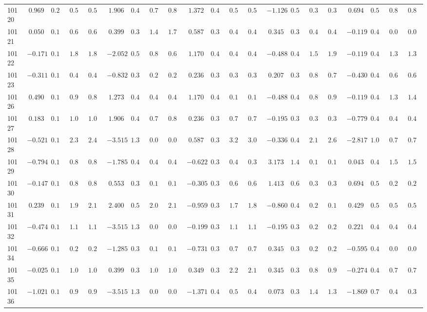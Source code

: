 \documentclass[6pt]{article}
\begin{document}
\begin{landscape}
{\begin{longtable}{lrrrrrrrrrrrrrrrrrrrr}
10120&$ 0.969$&$0.240$&$0.595$&$0.566$&$ 1.906$&$0.483$&$0.791$&$0.888$&$ 1.372$&$0.492$&$0.530$&$0.588$&$-1.126$&$0.578$&$0.398$&$0.306$&$ 0.694$&$0.577$&$0.864$&$0.879$\tabularnewline
10121&$ 0.050$&$0.161$&$0.661$&$0.694$&$ 0.399$&$0.382$&$1.481$&$1.713$&$ 0.587$&$0.361$&$0.402$&$0.425$&$ 0.345$&$0.396$&$0.487$&$0.452$&$-0.119$&$0.426$&$0.017$&$0.017$\tabularnewline
10122&$-0.171$&$0.155$&$1.833$&$1.867$&$-2.052$&$0.572$&$0.878$&$0.690$&$ 1.170$&$0.443$&$0.441$&$0.480$&$-0.488$&$0.420$&$1.565$&$1.940$&$-0.119$&$0.426$&$1.391$&$1.366$\tabularnewline
10123&$-0.311$&$0.154$&$0.497$&$0.495$&$-0.832$&$0.330$&$0.240$&$0.260$&$ 0.236$&$0.340$&$0.375$&$0.387$&$ 0.207$&$0.387$&$0.821$&$0.793$&$-0.430$&$0.428$&$0.672$&$0.685$\tabularnewline
10126&$ 0.490$&$0.188$&$0.917$&$0.803$&$ 1.273$&$0.443$&$0.452$&$0.457$&$ 1.170$&$0.443$&$0.156$&$0.122$&$-0.488$&$0.420$&$0.854$&$0.996$&$-0.119$&$0.426$&$1.376$&$1.400$\tabularnewline
10127&$ 0.183$&$0.167$&$1.085$&$1.042$&$ 1.906$&$0.483$&$0.740$&$0.808$&$ 0.236$&$0.340$&$0.780$&$0.781$&$-0.195$&$0.390$&$0.330$&$0.359$&$-0.779$&$0.473$&$0.434$&$0.443$\tabularnewline
10128&$-0.521$&$0.155$&$2.364$&$2.405$&$-3.515$&$1.347$&$0.087$&$0.096$&$ 0.587$&$0.361$&$3.270$&$3.014$&$-0.336$&$0.401$&$2.149$&$2.637$&$-2.817$&$1.034$&$0.766$&$0.763$\tabularnewline
10129&$-0.794$&$0.164$&$0.817$&$0.850$&$-1.785$&$0.486$&$0.427$&$0.471$&$-0.622$&$0.335$&$0.418$&$0.391$&$ 3.173$&$1.487$&$0.122$&$0.133$&$ 0.043$&$0.438$&$1.521$&$1.516$\tabularnewline
10130&$-0.147$&$0.155$&$0.870$&$0.817$&$ 0.553$&$0.395$&$0.119$&$0.119$&$-0.305$&$0.330$&$0.676$&$0.674$&$ 1.413$&$0.633$&$0.328$&$0.321$&$ 0.694$&$0.577$&$0.282$&$0.288$\tabularnewline
10131&$ 0.239$&$0.170$&$1.986$&$2.120$&$ 2.400$&$0.530$&$2.083$&$2.163$&$-0.959$&$0.358$&$1.745$&$1.866$&$-0.860$&$0.496$&$0.247$&$0.199$&$ 0.429$&$0.504$&$0.534$&$0.572$\tabularnewline
10132&$-0.474$&$0.154$&$1.148$&$1.144$&$-3.515$&$1.347$&$0.087$&$0.096$&$-0.199$&$0.330$&$1.129$&$1.136$&$-0.195$&$0.390$&$0.252$&$0.298$&$ 0.221$&$0.462$&$0.454$&$0.421$\tabularnewline
10134&$-0.666$&$0.159$&$0.281$&$0.298$&$-1.285$&$0.375$&$0.139$&$0.130$&$-0.731$&$0.340$&$0.743$&$0.778$&$ 0.345$&$0.396$&$0.232$&$0.232$&$-0.595$&$0.444$&$0.020$&$0.021$\tabularnewline
10135&$-0.025$&$0.159$&$1.089$&$1.052$&$ 0.399$&$0.382$&$1.010$&$1.099$&$ 0.349$&$0.345$&$2.289$&$2.180$&$ 0.345$&$0.396$&$0.861$&$0.901$&$-0.274$&$0.422$&$0.757$&$0.757$\tabularnewline
10136&$-1.021$&$0.178$&$0.958$&$0.997$&$-3.515$&$1.347$&$0.087$&$0.096$&$-1.371$&$0.418$&$0.510$&$0.401$&$ 0.073$&$0.383$&$1.402$&$1.309$&$-1.869$&$0.792$&$0.419$&$0.393$\tabularnewline

\end{longtable}}
\end{landscape}
\end{document}
